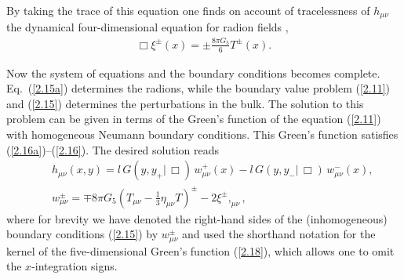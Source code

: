 \documentclass[a4paper,preprint,nofootinbib,
                 showpacs,preprintnumbers,amsmath,amssymb]{revtex4}
\begin{document}
By taking the trace of this equation one finds on account of 
tracelessness of $h_{\mu\nu}$ the dynamical four-dimensional 
equation for radion fields \cite{GT}, 
    \begin{eqnarray} 
   \Box \xi^\pm(x) =\pm\frac{8\pi G_5}6 T^\pm(x).  \label{2.15a} 
    \end{eqnarray} 
 
Now the system of equations and the boundary conditions becomes 
complete. 
Eq.~(\ref{2.15a}) determines the radions, while the boundary value 
problem (\ref{2.11}) and (\ref{2.15}) determines the perturbations 
in the bulk. The solution to this problem can be given in terms of 
the Green's function of the equation (\ref{2.11}) with homogeneous 
Neumann boundary conditions. This Green's function 
satisfies (\ref{2.16a})--(\ref{2.16}). The desired solution reads 
    \begin{eqnarray} 
    &&h_{\mu\nu}(x,y)=l\,G(y,y_+|\,\Box)\, 
    w^+_{\mu\nu}(x)- 
    l\,G(y,y_-|\,\Box)\,w^-_{\mu\nu}(x),    \label{2.17}\\ 
    &&w^\pm_{\mu\nu}= 
    \mp 8\pi G_5 \left( T_{\mu \nu} - 
    \frac13 \eta_{\mu \nu} 
    T \right)^\pm-2\xi^\pm,_{\mu \nu},  \nonumber 
    \end{eqnarray} 
where for brevity we have denoted the right-hand sides of the 
(inhomogeneous) boundary conditions (\ref{2.15}) by 
$w^\pm_{\mu\nu}$ and used the shorthand notation for the kernel of 
the five-dimensional Green's function (\ref{2.18}), which allows 
one to omit the $x$-integration signs. 
 
\end{document}
